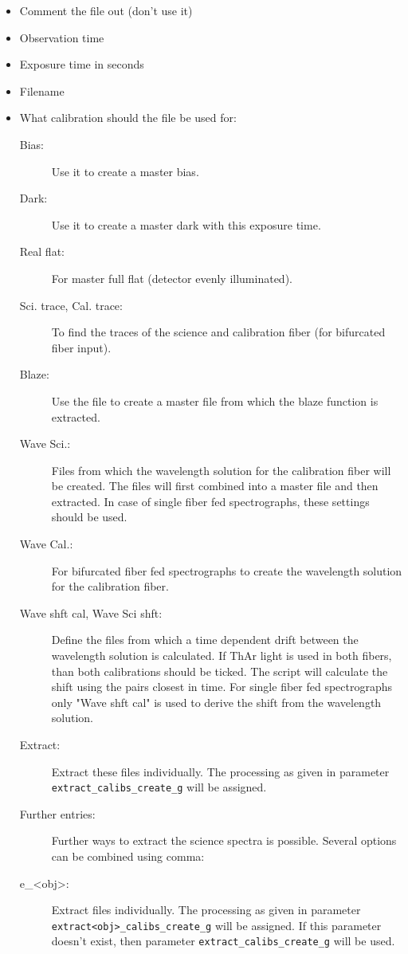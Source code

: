 \documentclass[10pt,a4paper]{article}
\begin{document}
\begin{itemize}\setlength\itemsep{0em}
  \item Comment the file out (don't use it)
  \item Observation time
  \item Exposure time in seconds
  \item Filename
  \item What calibration should the file be used for:
    \begin{description}
      \item[Bias:] Use it to create a master bias.
      \item[Dark:] Use it to create a master dark with this exposure time.
      \item[Real flat:] For master full flat (detector evenly illuminated).
      \item[Sci. trace, Cal. trace:] To find the traces of the science and calibration fiber (for bifurcated fiber input).
      \item[Blaze:] Use the file to create a master file from which the blaze function is extracted.
      \item[Wave Sci.:] Files from which the wavelength solution for the calibration fiber will be created. The files will first combined into a master file and then extracted. In case of single fiber fed spectrographs, these settings should be used.
      \item[Wave Cal.:] For bifurcated fiber fed spectrographs to create the wavelength solution for the calibration fiber.
      \item[Wave shft cal, Wave Sci shft:] Define the files from which a time dependent drift between the wavelength solution is calculated. If ThAr light is used in both fibers, than both calibrations should be ticked. The script will calculate the shift using the pairs closest in time. For single fiber fed spectrographs only "Wave shft cal" is used to derive the shift from the wavelength solution.
      \item[Extract:] Extract these files individually. The processing as given in parameter \verb|extract_calibs_create_g| will be assigned.
      \item[Further entries:] Further ways to extract the science spectra is possible. Several options can be combined using comma:
      \item[e\_\textless obj\textgreater :] Extract files individually. The processing as given in parameter \verb|extract<obj>_calibs_create_g| will be assigned. If this parameter doesn't exist, then parameter \verb|extract_calibs_create_g| will be used.

\end{description}
\end{itemize}
\end{document}
